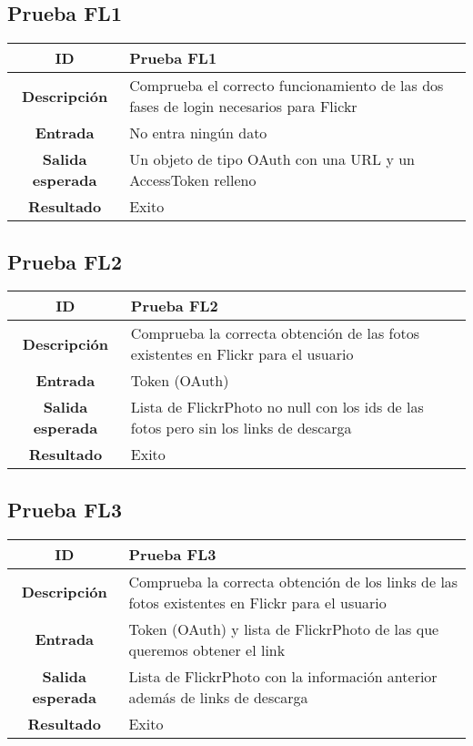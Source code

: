 \documentclass{scrartcl}
\begin{document}
\subsection{Prueba FL1}

\begin{tabularx}{14cm}{|c|X|}
	\hline \textbf{ID} & Prueba FL1 \\ 
	\hline \textbf{Descripción} & Comprueba el correcto funcionamiento de las dos fases de login necesarios para Flickr \\	 
	\hline  \textbf{Entrada}		& No entra ningún dato \\ 
	\hline  \textbf{Salida esperada}			& Un objeto de tipo OAuth con una URL y un AccessToken relleno\\
	\hline  \textbf{Resultado}			& Exito \\
	\hline 
\end{tabularx} 

\subsection{Prueba FL2}

\begin{tabularx}{14cm}{|c|X|}
	\hline \textbf{ID} & Prueba FL2 \\ 
	\hline \textbf{Descripción} & Comprueba la correcta obtención de las fotos existentes en Flickr para el usuario \\	 
	\hline  \textbf{Entrada}		& Token (OAuth) \\ 
	\hline  \textbf{Salida esperada}			& Lista de FlickrPhoto no null con los ids de las fotos pero sin los links de descarga\\
	\hline  \textbf{Resultado}			& Exito \\
	\hline 
\end{tabularx} 

\subsection{Prueba FL3}

\begin{tabularx}{14cm}{|c|X|}
	\hline \textbf{ID} & Prueba FL3\\ 
	\hline \textbf{Descripción} & Comprueba la correcta obtención de los links de las fotos existentes en Flickr para el usuario \\	 
	\hline  \textbf{Entrada}		& Token (OAuth) y lista de FlickrPhoto de las que queremos obtener el link \\ 
	\hline  \textbf{Salida esperada}			& Lista de FlickrPhoto con la información anterior además de links de descarga\\
	\hline  \textbf{Resultado}			& Exito \\
	\hline 
\end{tabularx} 
\end{document}
